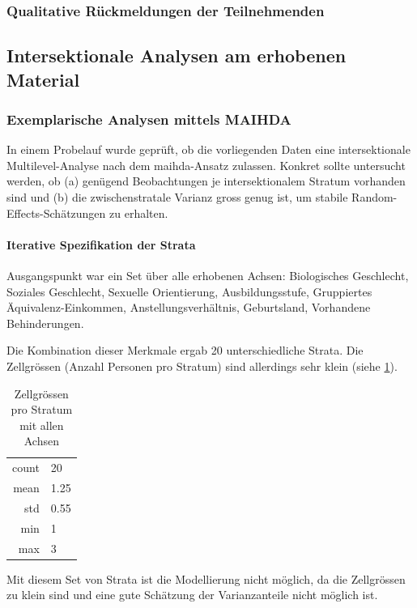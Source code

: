 \subsubsection{Qualitative Rückmeldungen der Teilnehmenden}

\subsection{Intersektionale Analysen am erhobenen Material}

\subsubsection{Exemplarische Analysen mittels MAIHDA}
\label{sec:pilot_maihda}

In einem Probelauf wurde geprüft, ob die vorliegenden Daten eine intersektionale Multilevel-Analyse nach dem \gls{maihda}-Ansatz zulassen. Konkret sollte untersucht werden, ob (a) genügend Beobachtungen je intersektionalem Stratum vorhanden sind und (b) die zwischenstratale Varianz gross genug ist, um stabile Random-Effects-Schätzungen zu erhalten.

\paragraph{Iterative Spezifikation der Strata}
Ausgangspunkt war ein Set über alle erhobenen Achsen: Biologisches Geschlecht, Soziales Geschlecht, Sexuelle Orientierung, Ausbildungsstufe, Gruppiertes Äquivalenz-Einkommen, Anstellungsverhältnis, Geburtsland, Vorhandene Behinderungen.

Die Kombination dieser Merkmale ergab 20 unterschiedliche Strata. Die Zellgrössen (Anzahl Personen pro Stratum) sind allerdings sehr klein (siehe \cref{tab:zellgroessen_alle_achsen}).

\begin{table}[h]
    \centering
    \begin{tabular}{rl}
        count & 20 \\
        mean & 1.25 \\
        std & 0.55 \\
        min & 1 \\
        max & 3 \\
    \end{tabular}
    \caption{Zellgrössen pro Stratum mit allen Achsen}
    \label{tab:zellgroessen_alle_achsen}
\end{table}

Mit diesem Set von Strata ist die Modellierung nicht möglich, da die Zellgrössen zu klein sind und eine gute Schätzung der Varianzanteile nicht möglich ist.

